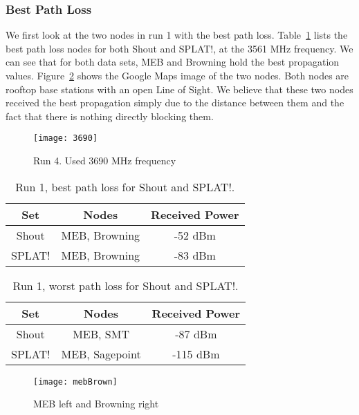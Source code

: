 \subsubsection*{Best Path Loss}
We first look at the two nodes in run 1 with the best path loss. Table~\ref{table:2} lists the best path loss nodes for both Shout and SPLAT!,
at the 3561 MHz frequency. We can see that for both data sets, MEB and Browning hold the best propagation values. 
Figure~\ref{fig:mebBrown} shows the Google Maps image of the two nodes. Both nodes are rooftop base stations with an open Line of Sight.
We believe that these two nodes received the best propagation simply due to the distance between them and the fact that there is nothing
directly blocking them.  

\begin{figure}
  \centering
  \texttt{[image: 3690]}
  \caption{Run 4. Used 3690 MHz frequency}
  \label{fig:3690}
\end{figure}

\begin{table}[h!]
\centering
\begin{tabular}{||c c c||} 
 \hline
 \textbf{Set} & \textbf{Nodes} & \textbf{Received Power} \\ [0.5ex] 
 \hline\hline
Shout & MEB, Browning  & -52 dBm \\ 
SPLAT! & MEB, Browning  & -83 dBm \\ [1ex] 
 \hline
\end{tabular}
\caption{Run 1, best path loss for Shout and SPLAT!.}
\label{table:2}
\end{table}

\begin{table}[h!]
\centering
\begin{tabular}{||c c c||} 
 \hline
 \textbf{Set} & \textbf{Nodes} & \textbf{Received Power} \\ [0.5ex] 
 \hline\hline
 Shout & MEB, SMT & -87 dBm\\ 
 SPLAT! & MEB, Sagepoint & -115 dBm\\ [1ex] 
 \hline
\end{tabular}
\caption{Run 1, worst path loss for Shout and SPLAT!.}
\label{table:3}
\end{table}

\begin{figure}
  \centering
  \texttt{[image: mebBrown]}
  \caption{MEB left and Browning right}
  \label{fig:mebBrown}
\end{figure}

